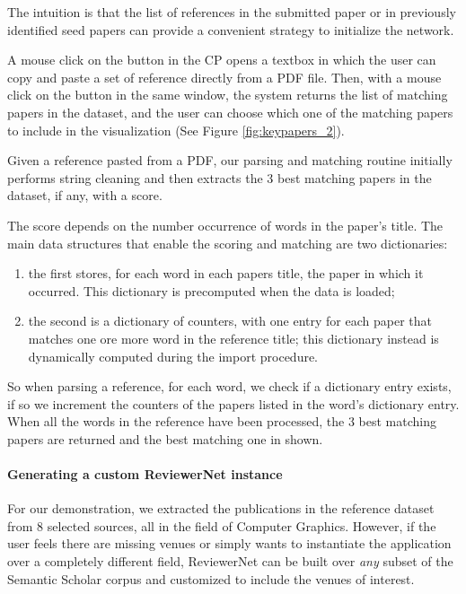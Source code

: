The intuition is that the list of references in the submitted paper or in previously identified seed papers can provide a convenient strategy to initialize the network.

A mouse click on the  button in the CP opens a textbox in which the user can copy and paste a set of reference directly from a PDF file. Then, with a mouse click on the  button in the same window, the system returns the list of matching papers in the dataset, and the user can choose which one of the matching papers to include in the visualization (See Figure \ref{fig:keypapers_2}).

Given a reference pasted from a PDF, our parsing and matching routine initially performs string cleaning and then extracts the 3 best matching papers in the dataset, if any, with a score.

The score depends on the number occurrence of words in the paper's title. The main data structures that enable the scoring and matching are two dictionaries:
\begin{enumerate}
    \item the first stores, for each word in each papers title, the paper in which it occurred. This dictionary is precomputed when the data is loaded;  
    \item the second is a dictionary of counters, with one entry for each paper that matches one ore more word in the reference title; this dictionary instead is dynamically computed during the import procedure.
\end{enumerate}  

So when parsing a reference, for each word, we check if a dictionary entry exists, if so we increment the counters of the papers listed in the word's dictionary entry. When all the words in the reference have been processed, the 3 best matching papers are returned and the best matching one in shown.

\paragraph*{Generating a custom ReviewerNet instance}

For our demonstration, we extracted the publications in the reference dataset from 8 selected sources, all in the field of Computer Graphics. However, if the user feels there are missing venues or simply wants to instantiate the application over a completely different field, ReviewerNet can be built over \emph{any} subset of the Semantic Scholar corpus and customized to include the venues of interest.  

